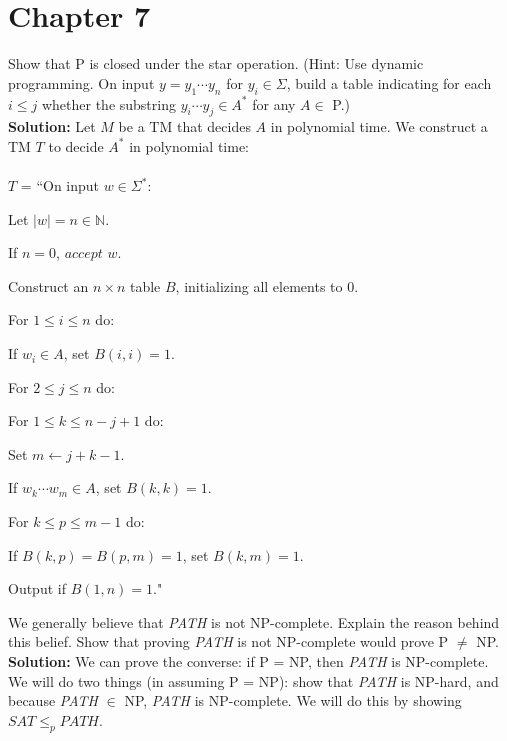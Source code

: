 \section{Chapter 7}
\begin{enumerate}
\item[7.15]Show that P is closed under the star operation. (Hint: Use dynamic programming. On input $y = y_1\cdots y_n$ for $y_i \in \Sigma$, build a table indicating for each $i \le j$ whether the substring $y_i\cdots y_j \in A^*$ for any $A \in$ P.)
\\
\textbf{Solution:} Let $M$ be a TM that decides $A$ in polynomial time. We construct a TM $T$ to decide $A^*$ in polynomial time:
\\ \\
$T$ = ``On input $w \in \Sigma^*$:


\begin{myEnumerate}
\item[1.]Let $|w| = n \in \mathbb{N}$.
\item[2.]If $n = 0$, $accept$ $w$.
\item[3.]Construct an $n \times n$ table $B$, initializing all elements to 0.
\item[4.]For $1 \le i \le n$ do:
\begin{myEnumerate}
\item[a.]If $w_i \in A$, set $B(i, i) = 1$.
\end{myEnumerate}
\item[5.]For $2 \le j \le n$ do:
\begin{myEnumerate}
\item[a.]For $1 \le k \le n-j+1$ do:
\begin{myEnumerate}
\item[i.]Set $m \leftarrow j+k-1$.
\item[ii.]If $w_k\cdots w_m \in A$, set $B(k,k) = 1$.
\item[iii.]For $k \le p \le m-1$ do:
\begin{myEnumerate}
\item[1.]If $B(k, p) = B(p, m) = 1$, set $B(k, m) = 1$.
\end{myEnumerate}
\end{myEnumerate}
\end{myEnumerate}
\item[6.]Output if $B(1, n) = 1$."
\end{myEnumerate}

\item[7.20]We generally believe that \emph{PATH} is not NP-complete. Explain the reason behind this belief. Show that proving \emph{PATH} is not NP-complete would prove P $\ne$ NP.
\\
\textbf{Solution:} We can prove the converse: if P = NP, then \emph{PATH} is NP-complete. We will do two things (in assuming P = NP): show that \emph{PATH} is NP-hard, and because \emph{PATH} $\in$ NP, \emph{PATH} is NP-complete. We will do this by showing $SAT \le_p PATH$.


\end{enumerate}
